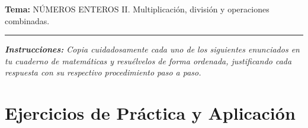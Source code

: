\documentclass[12pt, letterpaper]{article}
\begin{document}
	\vspace{0.2cm}
	\noindent \textbf{Tema:} NÚMEROS ENTEROS II. Multiplicación, división y operaciones combinadas.
	\vspace{0.2cm}
	\hrule
	\vspace{0.4cm}
	
	\noindent \textit{\textbf{Instrucciones:} Copia cuidadosamente cada uno de los siguientes enunciados en tu cuaderno de matemáticas y resuélvelos de forma ordenada, justificando cada respuesta con su respectivo procedimiento paso a paso.}
	\vspace{0.6cm}
	
	\section*{Ejercicios de Práctica y Aplicación}
	
\end{document}
